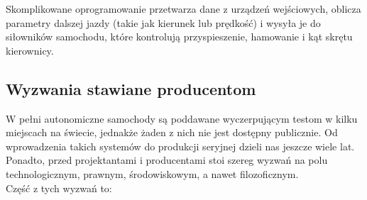 Skomplikowane oprogramowanie przetwarza dane z urządzeń wejściowych, oblicza parametry dalszej jazdy (takie jak kierunek lub prędkość) i wysyła je do siłowników samochodu, które kontrolują przyspieszenie, hamowanie i kąt skrętu kierownicy.

\subsection{Wyzwania stawiane producentom}
W pełni autonomiczne samochody są poddawane wyczerpującym testom w kilku miejscach na świecie, jednakże żaden z nich nie jest dostępny publicznie. Od wprowadzenia takich systemów do produkcji seryjnej dzieli nas jeszcze wiele lat. Ponadto, przed projektantami i producentami stoi szereg wyzwań na polu technologicznym, prawnym, środowiskowym, a nawet filozoficznym. \\
Część z tych wyzwań to:
